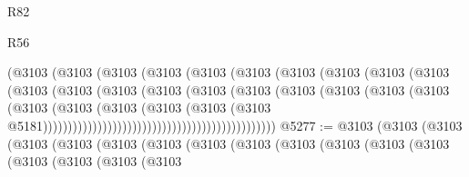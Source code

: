 \begin{lexlean}{R82}
\begin{lexlean}{R56}
\begin{coremodule}
{{{{{{{{{{{{{{{{{{{{{{{{{{{{{{{{{{{{{{{{{{{{{{{{{{{{{{{{{{{{{{{{{{{{{{{{{{{{{{{{{{{{{{{{{{{{{{{{{{{{{{{{{{{{{{{{{{{{{{{{{{{{{{{{{{{{{{{{{{{{{{{{{{{{{{{{{{{{{{{{{{{{{{{{{{{{{{{{{{{{{{{{{{{{{{{{{{{{{{{{{{{{{{{{{{{                                              (@3103
                                                (@3103
                                                  (@3103
                                                    (@3103
                                                      (@3103
                                                        (@3103
                                                          (@3103
                                                            (@3103
                                                              (@3103
                                                                (@3103
                                                                  (@3103
                                                                    (@3103
                                                                      (@3103
                                                                        (@3103
                                                                          (@3103
                                                                            (@3103
                                                                              (@3103
                                                                                (@3103
                                                                                  (@3103
                                                                                    (@3103
                                                                                      (@3103
                                                                                        (@3103
                                                                                          (@3103
                                                                                            (@3103
                                                                                              (@3103
                                                                                                (@3103
                                                                                                  @5181)))))))))))))))))))))))))))))))))))))))))))))))
@5277 := @3103
    (@3103
      (@3103
        (@3103
          (@3103
            (@3103
              (@3103
                (@3103
                  (@3103
                    (@3103
                      (@3103
                        (@3103
                          (@3103
                            (@3103
                              (@3103
                                (@3103
                                  (@3103
}}}}}}}}}}}}}}}}}}}}}}}}}}}}}}}}}}}}}}}}}}}}}}}}}}}}}}}}}}}}}}}}}}}}}}}}}}}}}}}}}}}}}}}}}}}}}}}}}}}}}}}}}}}}}}}}}}}}}}}}}}}}}}}}}}}}}}}}}}}}}}}}}}}}}}}}}}}}}}}}}}}}}}}}}}}}}}}}}}}}}}}}}}}}}}}}}}}}}}}}}}}}}}}}}}}
\end{coremodule}
\end{lexlean}
\end{lexlean}
